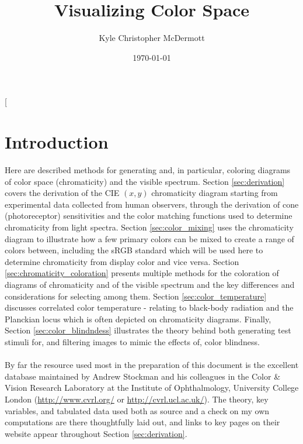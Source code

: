 \documentclass[twocolumn]{article}
\title{Visualizing Color Space}
\author{Kyle Christopher McDermott}
\date{\today}
\begin{document}
\begin{titlepage}
\maketitle
\thispagestyle{empty} %
\end{titlepage}

\twocolumn[
\section{Introduction} \label{sec:introduction}
Here are described methods for generating and, in particular, coloring diagrams of color space (chromaticity) and the visible spectrum.  Section \ref{sec:derivation} covers the derivation of the CIE $(x,y)$ chromaticity diagram starting from experimental data collected from human observers, through the derivation of cone (photoreceptor) sensitivities and the color matching functions used to determine chromaticity from light spectra.  Section \ref{sec:color_mixing} uses the chromaticity diagram to illustrate how a few primary colors can be mixed to create a range of colors between, including the sRGB standard which will be used here to determine chromaticity from display color and vice versa.  Section \ref{sec:chromaticity_coloration} presents multiple methods for the coloration of diagrams of chromaticity and of the visible spectrum and the key differences and considerations for selecting among them.  Section \ref{sec:color_temperature} discusses correlated color temperature - relating to black-body radiation and the Planckian locus which is often depicted on chromaticity diagrams.  Finally, Section \ref{sec:color_blindndess} illustrates the theory behind both generating test stimuli for, and filtering images to mimic the effects of, color blindness.\\ \\
By far the resource used most in the preparation of this document is the excellent database maintained by Andrew Stockman and his colleagues in the Color \& Vision Research Laboratory at the Institute of Ophthalmology, University College London (\url{http://www.cvrl.org/} or \url{http://cvrl.ucl.ac.uk/}).  The theory, key variables, and tabulated data used both as source and a check on my own computations are there thoughtfully laid out, and links to key pages on their website appear throughout Section \ref{sec:derivation}.
\end{document}
